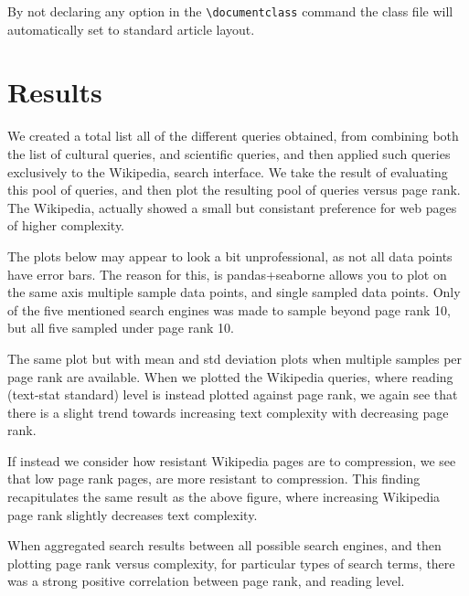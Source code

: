 \documentclass{clv3}
\begin{document}
By not declaring any option in the \verb|\documentclass| command the class file
will automatically set to standard article layout.

\section{Results}

We created a total list all of the different queries obtained, from combining both the list of cultural queries, and scientific queries, and then applied such queries exclusively to the Wikipedia, search interface. We take the result of evaluating this pool of queries, and then plot the resulting pool of queries versus page rank. The Wikipedia, actually showed a small but consistant preference for web pages of higher complexity.


%

The plots below may appear to look a bit unprofessional, as not all data points have error bars. The reason for this, is pandas+seaborne allows you to plot on the same axis multiple sample data points, and single sampled data points. Only of the five mentioned search engines was made to sample beyond page rank 10, but all five sampled under page rank 10.

%

The same plot but with mean and std deviation plots when multiple samples per page rank are available. When we plotted the Wikipedia queries, where reading (text-stat standard) level is instead plotted against page rank, we again see that there is a slight trend towards increasing text complexity with decreasing page rank. 


If instead we consider how resistant Wikipedia pages are to compression, we see that low page rank pages, are more resistant to compression. This finding recapitulates the same result as the above figure, where increasing Wikipedia page rank slightly decreases text complexity.

When aggregated search results between all possible search engines, and then plotting page rank versus complexity, for particular types of search terms, there was a strong positive correlation between page rank, and reading level.
\end{document}
